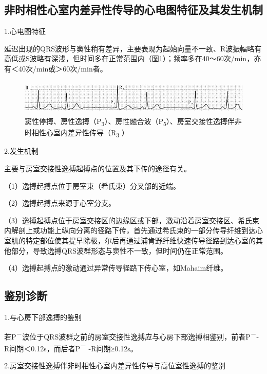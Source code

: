 \subsection{非时相性心室内差异性传导的心电图特征及其发生机制}

1.心电图特征

延迟出现的QRS波形与窦性稍有差异，主要表现为起始向量不一致、R波振幅略有高低或S波略有深浅，但时间多在正常范围内（图\ref{fig12-9}）；频率多在40～60次/min，亦有＜40次/min或＞60次/min者。

\begin{figure}[!htbp]
 \centering
 \includegraphics[width=5.58333in,height=0.66667in]{./images/Image00202.jpg}
 \captionsetup{justification=centering}
 \caption{窦性停搏、房性逸搏（P\textsubscript{3}）、房性融合波（P\textsubscript{5}）、房室交接性逸搏伴非时相性心室内差异性传导（R\textsubscript{3} ）}
 \label{fig12-9}
  \end{figure} 


2.发生机制

主要与房室交接性逸搏起搏点的位置及其下传的途径有关。

（1）逸搏起搏点位于房室束（希氏束）分叉部的近端。

（2）逸搏起搏点来源于心室分支。

（3）逸搏起搏点位于房室交接区的边缘区或下部，激动沿着房室交接区、希氏束内解剖上或功能上纵向分离的径路下传，首先通过希氏束的一部分传导纤维到达心室肌的特定部位使其提早除极，尔后再通过浦肯野纤维快速传导径路到达心室的其他部分，导致逸搏QRS波群形态与窦性不一致，但时间仍在正常范围。

（4）逸搏起搏点的激动通过异常传导径路下传心室，如Mahaim纤维。

\protect\hypertarget{text00019.htmlux5cux23subid184}{}{}

\subsection{鉴别诊断}

1.与心房下部逸搏的鉴别

若P\textsuperscript{－}波位于QRS波群之前的房室交接性逸搏应与心房下部逸搏相鉴别，前者P\textsuperscript{－}-R间期＜0.12s，而后者P\textsuperscript{－} -R间期≥0.12s。

2.房室交接性逸搏伴非时相性心室内差异性传导与高位室性逸搏的鉴别

